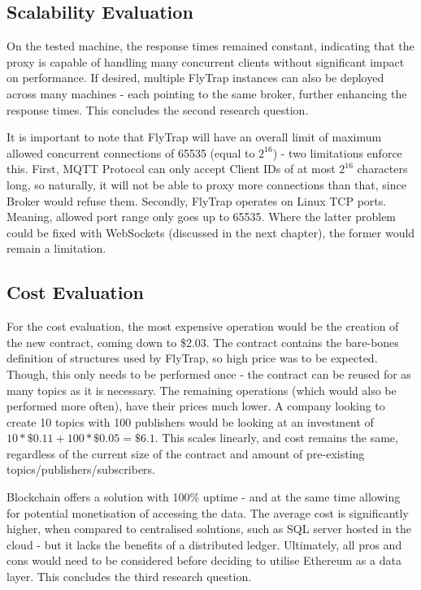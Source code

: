 \subsection{Scalability Evaluation}
On the tested machine, the response times remained constant, indicating that the proxy is capable of handling many concurrent clients without significant impact on performance. If desired, multiple FlyTrap instances can also be deployed across many machines - each pointing to the same broker, further enhancing the response times. This concludes the second research question.

It is important to note that FlyTrap will have an overall limit of maximum allowed concurrent connections of 65535 (equal to $2^{16}$) - two limitations enforce this. First, MQTT Protocol can only accept Client IDs of at most $2^{16}$ characters long, so naturally, it will not be able to proxy more connections than that, since Broker would refuse them. Secondly, FlyTrap operates on Linux TCP ports. Meaning, allowed port range only goes up to 65535. Where the latter problem could be fixed with WebSockets (discussed in the next chapter), the former would remain a limitation.
\subsection{Cost Evaluation}
For the cost evaluation, the most expensive operation would be the creation of the new contract, coming down to \$2.03. The contract contains the bare-bones definition of structures used by FlyTrap, so high price was to be expected. Though, this only needs to be performed once - the contract can be reused for as many topics as it is necessary. The remaining operations (which would also be performed more often), have their prices much lower. A company looking to create 10 topics with 100 publishers would be looking at an investment of $10 * \$0.11 + 100 * \$0.05 = \$6.1$. This scales linearly, and cost remains the same, regardless of the current size of the contract and amount of pre-existing topics/publishers/subscribers.

Blockchain offers a solution with 100\% uptime - and at the same time allowing for potential monetisation of accessing the data. The average cost is significantly higher, when compared to centralised solutions, such as SQL server hosted in the cloud - but it lacks the benefits of a distributed ledger. Ultimately, all pros and cons would need to be considered before deciding to utilise Ethereum as a data layer. This concludes the third research question.
